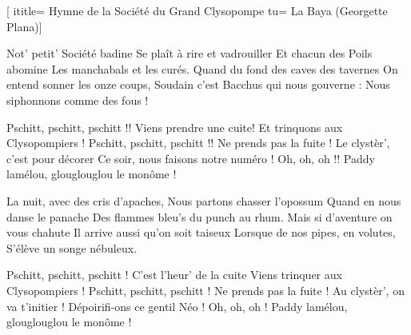  [
ititle= {Hymne de la Société du Grand Clysopompe}
tu= {La Baya (Georgette Plana)}]


\beginverse
Not' petit' Société badine
Se plaît à rire et vadrouiller
Et chacun des Poils abomine
Les manchabals et les curés.
Quand du fond des caves des tavernes
On entend sonner les onze coups,
Soudain c'est Bacchus qui nous gouverne :
Nous siphonnons comme des fous !
\endverse

\beginchorus
Pschitt, pschitt, pschitt !! 
Viens prendre une cuite! 
Et trinquons aux Clysopompiers !
Pschitt, pschitt, pschitt !!
Ne prends pas la fuite !
Le clystèr', c'est pour décorer
Ce soir, nous faisons notre numéro ! Oh, oh, oh !!
 {Paddy lamélou, glouglouglou le monôme !}
\endchorus

\beginverse
La nuit, avec des cris d'apaches,
Nous partons chasser l'opossum
Quand en nous danse le panache
Des flammes bleu's du punch au rhum.
Mais si d'aventure on vous chahute
Il arrive aussi qu'on soit taiseux
Lorsque de nos pipes, en volutes,
S'élève un songe nébuleux.
\endverse

\beginchorus
Pschitt, pschitt, pschitt !
C'est l'heur' de la cuite
Viens trinquer aux Clysopompiers !
Pschitt, pschitt, pschitt ! 
Ne prends pas la fuite !
Au clystèr', on va t'initier !
Dépoirifi-ons ce gentil Néo ! Oh, oh, oh !
 {Paddy lamélou, glouglouglou le monôme !}
\endchorus

\endsong